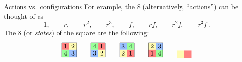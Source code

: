 \documentclass[8pt,handout]{beamer}
\newcommand{\Pause}{}      %
\begin{document}
\begin{frame}{Actions vs.\ configurations}
  For example, the 8  (alternatively, ``actions'')
  can be thought of as
  \[
  1,\qquad r,\qquad r^2,\qquad r^3,\qquad f,\qquad rf,\qquad r^2f,\qquad r^3f\,.
  \]
  \Pause The 8  (or \emph{states}) of the
  square are the following:
  \[
    \begin{tikzpicture}[scale=.75]
      \path[fill=actRed] (0,.5) rectangle ++(.5,.5); 
      \path[fill=actYellow] (.5,.5) rectangle ++(.5,.5);
      \path[fill=actGreen] (0,0) rectangle ++(.5,.5);
      \path[fill=actBlue] (.5,0) rectangle ++(.5,.5);
      \draw (.25,.75) node{$1$}; \draw (.75,.75) node{$2$};
      \draw (.25,.25) node{$4$}; \draw (.75,.25) node{$3$};
      \draw (0,0) rectangle (1,1);
    \end{tikzpicture}
    \qquad
    \begin{tikzpicture}[scale=.75]
      \path[fill=actGreen] (0,.5) rectangle ++(.5,.5); 
      \path[fill=actRed] (.5,.5) rectangle ++(.5,.5);
      \path[fill=actBlue] (0,0) rectangle ++(.5,.5);
      \path[fill=actYellow] (.5,0) rectangle ++(.5,.5);
      \draw (0,0) rectangle (1,1);
      \draw (.25,.75) node{$4$}; \draw (.75,.75) node{$1$};
        \draw (.25,.25) node{$3$}; \draw (.75,.25) node{$2$};
    \end{tikzpicture}
    \qquad
    \begin{tikzpicture}[scale=.75]
      \path[fill=actBlue] (0,.5) rectangle ++(.5,.5); 
      \path[fill=actGreen] (.5,.5) rectangle ++(.5,.5);
      \path[fill=actYellow] (0,0) rectangle ++(.5,.5);
      \path[fill=actRed] (.5,0) rectangle ++(.5,.5);
      \draw (0,0) rectangle (1,1);
      \draw (.25,.75) node{$3$}; \draw (.75,.75) node{$4$};
        \draw (.25,.25) node{$2$}; \draw (.75,.25) node{$1$};
    \end{tikzpicture}
    \qquad
    \begin{tikzpicture}[scale=.75]
      \path[fill=actYellow] (0,.5) rectangle ++(.5,.5); 
      \path[fill=actBlue] (.5,.5) rectangle ++(.5,.5);
      \path[fill=actRed] (0,0) rectangle ++(.5,.5);
      \path[fill=actGreen] (.5,0) rectangle ++(.5,.5);
      \draw (0,0) rectangle (1,1);
      \draw (.25,.75) node{$2$}; \draw (.75,.75) node{$3$};
      \draw (.25,.25) node{$1$}; \draw (.75,.25) node{$4$};
    \end{tikzpicture}
    \qquad
    \begin{tikzpicture}[scale=.75]
      \path[fill=actYellow] (0,.5) rectangle ++(.5,.5); 
      \path[fill=actRed] (.5,.5) rectangle ++(.5,.5);

\end{tikzpicture}\]
\end{frame}
\end{document}
